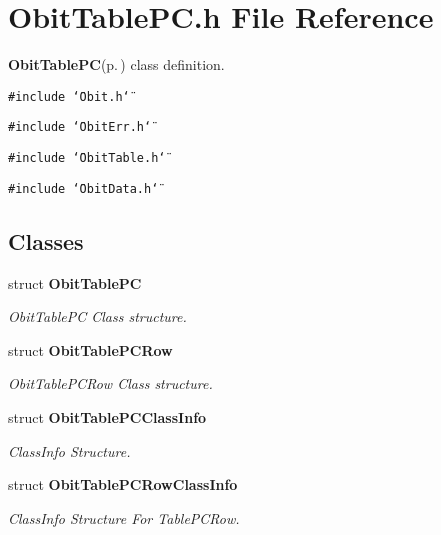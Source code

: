 \section{Obit\-Table\-PC.h File Reference}
\label{ObitTablePC_8h}
{\bf Obit\-Table\-PC}{\rm (p.\,\pageref{structObitTablePC})} class definition. 

{\tt \#include \char`\"{}Obit.h\char`\"{}}\par
{\tt \#include \char`\"{}Obit\-Err.h\char`\"{}}\par
{\tt \#include \char`\"{}Obit\-Table.h\char`\"{}}\par
{\tt \#include \char`\"{}Obit\-Data.h\char`\"{}}\par
\subsection*{Classes}
\begin{CompactItemize}
\item 
struct {\bf Obit\-Table\-PC}
\begin{CompactList}\small\item\em Obit\-Table\-PC Class structure. \item\end{CompactList}\item 
struct {\bf Obit\-Table\-PCRow}
\begin{CompactList}\small\item\em Obit\-Table\-PCRow Class structure. \item\end{CompactList}\item 
struct {\bf Obit\-Table\-PCClass\-Info}
\begin{CompactList}\small\item\em Class\-Info Structure. \item\end{CompactList}\item 
struct {\bf Obit\-Table\-PCRow\-Class\-Info}
\begin{CompactList}\small\item\em Class\-Info Structure For Table\-PCRow. \item\end{CompactList}\end{CompactItemize}
